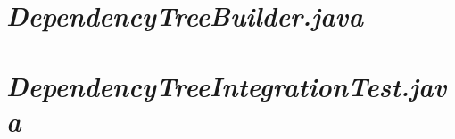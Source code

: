 \clearpage
\section{\textit{\textbf{DependencyTreeBuilder.java}}}


\clearpage
\section{\textit{\textbf{DependencyTreeIntegrationTest.java}}}

